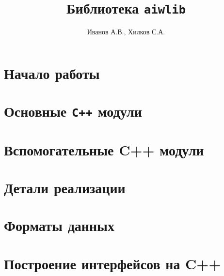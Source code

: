 \documentclass[12pt]{book}
\begin{document}
\title{Библиотека {\tt aiwlib}}
\author{Иванов А.В., Хилков С.А.}

\maketitle

\tableofcontents


\chapter{Начало работы} %
% 



\chapter{Основные {\tt С++} модули}






\chapter{Вспомогательные C++ модули}








\chapter{Детали реализации}



\chapter{Форматы данных}




\chapter{Построение интерфейсов на C++}





\end{document}
